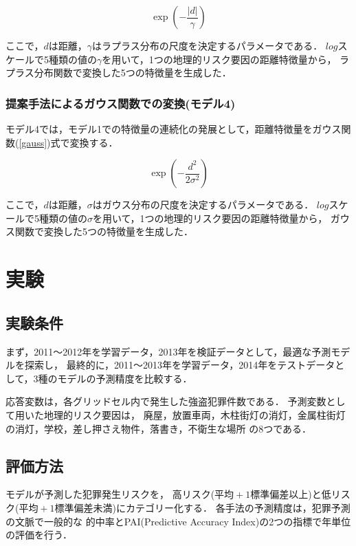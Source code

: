 \documentclass[12pt,a4paper,oneside]{jsbook}
\theoremstyle{plain}
\providecommand{\abs}[1]{\lvert#1\rvert}
\begin{document}
\begin{equation}\label{laplace}
  \exp(-\frac{\abs{d}}{\gamma})
\end{equation}

ここで，$d$は距離，$\gamma$はラプラス分布の尺度を決定するパラメータである．
$log$スケールで5種類の値の$\gamma$を用いて，1つの地理的リスク要因の距離特徴量から，
ラプラス分布関数で変換した5つの特徴量を生成した．

\subsection{提案手法によるガウス関数での変換(モデル4)}
モデル4では，モデル1での特徴量の連続化の発展として，距離特徴量をガウス関数(\ref{gauss})式で変換する．

\begin{equation}\label{gauss}
  \exp(-\frac{d^2}{2\sigma^2})
\end{equation}

ここで，$d$は距離，$\sigma$はガウス分布の尺度を決定するパラメータである．
$log$スケールで5種類の値の$\sigma$を用いて，1つの地理的リスク要因の距離特徴量から，
ガウス関数で変換した5つの特徴量を生成した．

\chapter{実験}
\label{chapter_4}

\section{実験条件}
まず，2011〜2012年を学習データ，2013年を検証データとして，最適な予測モデルを探索し，
最終的に，2011〜2013年を学習データ，2014年をテストデータとして，3種のモデルの予測精度を比較する．

応答変数は，各グリッドセル内で発生した強盗犯罪件数である．
予測変数として用いた地理的リスク要因は，
廃屋，放置車両，木柱街灯の消灯，金属柱街灯の消灯，学校，差し押さえ物件，落書き，不衛生な場所
の8つである．
\section{評価方法}
モデルが予測した犯罪発生リスクを，
高リスク($平均+1標準偏差以上$)と低リスク($平均+1標準偏差未満$)にカテゴリー化する．
各手法の予測精度は，犯罪予測の文脈で一般的な
的中率とPAI(Predictive Accuracy Index)の2つの指標で年単位の評価を行う．
\end{document}
